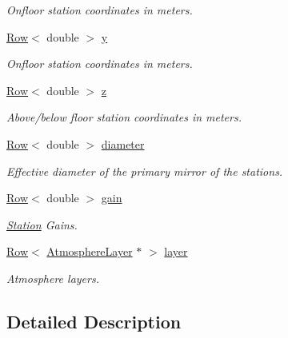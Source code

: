\begin{DoxyCompactItemize}
\begin{DoxyCompactList}\small\item\em Onfloor station coordinates in meters. \item\end{DoxyCompactList}\item 
\hyperlink{classRow}{Row}$<$ double $>$ \hyperlink{classcArray_aae5f928d97c8cdd9172a4dbca0e84a73}{y}
\begin{DoxyCompactList}\small\item\em Onfloor station coordinates in meters. \item\end{DoxyCompactList}\item 
\hyperlink{classRow}{Row}$<$ double $>$ \hyperlink{classcArray_ae444533f622d7d687ab802229de7ca59}{z}
\begin{DoxyCompactList}\small\item\em Above/below floor station coordinates in meters. \item\end{DoxyCompactList}\item 
\hyperlink{classRow}{Row}$<$ double $>$ \hyperlink{classcArray_a80f01dfdf1b0acdef41d79ce888ae12c}{diameter}
\begin{DoxyCompactList}\small\item\em Effective diameter of the primary mirror of the stations. \item\end{DoxyCompactList}\item 
\hyperlink{classRow}{Row}$<$ double $>$ \hyperlink{classcArray_a2a642c899d67cfeb5dc87d4e5adf0f3f}{gain}
\begin{DoxyCompactList}\small\item\em \hyperlink{classStation}{Station} Gains. \item\end{DoxyCompactList}\item 
\hyperlink{classRow}{Row}$<$ \hyperlink{classAtmosphereLayer}{AtmosphereLayer} $\ast$ $>$ \hyperlink{classcArray_a78170c7d575b10616a74a84c6a6ebe70}{layer}
\begin{DoxyCompactList}\small\item\em Atmosphere layers. \item\end{DoxyCompactList}\end{DoxyCompactItemize}


\subsection{Detailed Description}


